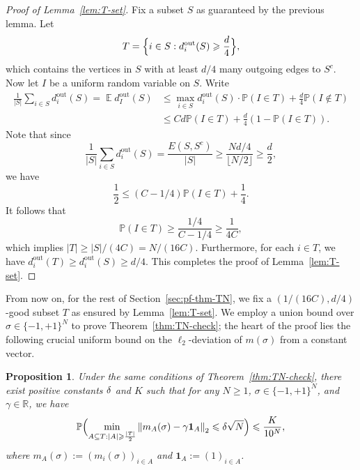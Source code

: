 \documentclass[letterpaper,11pt,reqno]{amsart}
\newtheorem{prop}[thm]{Proposition}
\renewcommand{\le}{\leqslant}
\renewcommand{\ge}{\geqslant}
\renewcommand{\geq}{\geqslant}
\newcommand{\norm}[1]{\left\Vert#1\right\Vert}
\newcommand{\abs}[1]{\left\vert#1\right\vert}
\newcommand{\mv}[1]{\boldsymbol{#1}}\newcommand{\mvinfty}{\boldsymbol{\infty}}\newcommand{\mvzero}{\boldsymbol{0}}
\newcommand{\mvm}{{m}}
\newcommand{\mvgs}{{\sigma}}
\newcommand{\bP}{\mathbb{P}}\newcommand{\bQ}{\mathbb{Q}}\newcommand{\bR}{\mathbb{R}}
\DeclareMathOperator{\E}{\mathds{E}}
\newcommand{\dout}{d^{\mathrm{out}}}
\begin{document}
 
\begin{proof}[Proof of Lemma~\ref{lem:T-set}]
Fix a subset $S$ as guaranteed by the previous lemma. 
Let
\begin{align*}
   T=\Bigl\{i \in S: \dout_i(S) \ge \frac{d}{4}\Bigr\},
\end{align*}
which contains the vertices in $S$ with at least ${d}/{4}$ many outgoing edges to $S^c$. Now let $I$ be a uniform random variable on $S$. Write 
\begin{align*}
\frac{1}{\abs{S}}\sum_{i\in S} \dout_i(S) = \E \dout_I(S) & \le \max_{i\in S}\dout_i(S) \cdot \bP(I\in T) + \frac{d}{4} \bP(I \notin T)  \\
& \le Cd  \bP(I \in T) + \frac{d}{4} ( 1- \bP(I \in T)).
\end{align*}
Note that since $$ \frac{1}{\abs{S}}\sum_{i\in S} \dout_i(S)=\frac{E(S,S^c)}{|S|}\geq \frac{Nd/4}{\lfloor N/2\rfloor} \ge \frac{d}{2},$$ we have
\[
\frac12 \le (C-1/4) \bP(I \in T) +  \frac{1}{4}.
\]
It follows that
\[
\bP(I \in T) \ge \frac{1/4}{C- 1/4} \ge \frac{1}{4C},
\]
which implies $\abs{T} \ge {\abs{S}}/{(4C)} = {N}/{(16C)}$. Furthermore, for each $i \in T$, we have $\dout_i(T) \ge \dout_i(S) \ge d/4$. This completes the proof of Lemma~\ref{lem:T-set}.
\end{proof}
From now on, for the rest of Section~\ref{sec:pf-thm-TN}, we fix a $(1/(16C), d/4)$-good subset $T$ as ensured by Lemma~\ref{lem:T-set}. We employ a union bound over $\mvgs \in \{-1,+1\}^N$ to prove  Theorem~\ref{thm:TN-check}; the heart of the proof lies the following crucial uniform bound on the $\ell_2$-deviation of $\mvm(\mvgs)$ from a constant vector. 


\begin{prop}\label{prop:TN-reduced}
Under the same conditions of Theorem~\ref{thm:TN-check}, there exist positive constants $\delta$ and $K$ such that for any   $N\geq 1$,
$\mvgs \in \{-1,+1\}^N$, and  $\gamma \in \bR$, we have
\begin{align}\label{eq:res-no-theta}
\bP\Bigl( \min_{ A\subseteq T: |A| \ge \frac{\abs{T}}{2}}  \norm{\mvm_A(\mvgs) - \gamma\mv1_A}_{2} \le \gd \sqrt{N}\Bigr) \le \frac{K}{10^N},
\end{align}
where $m_A(\mvgs):=(m_i(\mvgs))_{i\in A}$ and $\mv1_A:=(1)_{i\in A}$.
\end{prop}
\end{document}

